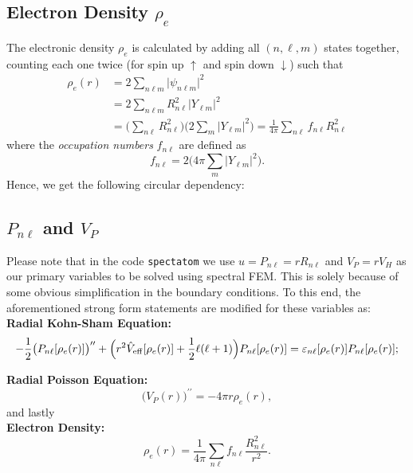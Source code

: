 \documentclass[12pt,dvipsnames]{article}
\begin{document}
\subsection{Electron Density $\rho_e$} \label{sec:nonlin}
The electronic density $\rho_e$ is calculated by adding all $(n, \ell, m)$ states together, counting each one
twice (for spin up $\uparrow$ and spin down $\downarrow$) such that
\begin{align*}
\rho_e(r) & = 2 \sum\limits_{n \ell m} \vert \psi_{n \ell m} \vert^2 \\
& = 2 \sum\limits_{n \ell m}  R_{n \ell}^2 \vert Y_{\ell m} \vert^2\\
& = \Big( \sum\limits_{n \ell} R_{n \ell}^2 \Big) \Big(2 \sum\limits_m \vert Y_{\ell m} \vert^2 \Big) =  \frac{1}{4 \pi} \sum\limits_{n \ell} f_{n \ell} R_{n \ell}^2
\end{align*}
where the \emph{occupation numbers} $f_{n \ell}$ are defined as
\begin{equation}		\nonumber
f_{n \ell} = 2 \Big( 4 \pi \sum\limits_m \vert Y_{\ell m} \vert^2 \Big).
\end{equation}
Hence, we get the following circular dependency:\\
\begin{center}
\end{center}
%
\subsection{$P_{n \ell}$ and $V_P$}
Please note that in the code \texttt{spectatom} we use $u = P_{n \ell} = r R_{n \ell}$
and $V_P = r V_H$ as our primary variables to be solved using spectral FEM. 
This is solely because of some obvious simplification in the boundary conditions. 
To this end, the aforementioned strong form statements are modified for these variables 
as:\\

\noindent
{\bf Radial Kohn-Sham Equation:}
\begin{equation}
-\frac{1}{2} \big( P_{n \ell}[\rho_e(r)] \big)^{\prime\prime} + \Big(r^2 \hat{V}_{\rm{eff}}[\rho_e(r)] + \frac{1}{2} \ell (\ell + 1) \Big) P_{n \ell}[\rho_e(r)] = \varepsilon_{n \ell}[\rho_e(r)] P_{n \ell}[\rho_e(r)];
\end{equation}

\noindent
{\bf Radial Poisson Equation:}
\begin{equation}
\big(V_P(r)\big)^{\prime\prime} = -4 \pi r \rho_e(r),
\end{equation} 
and lastly\\
{\bf Electron Density:}
\begin{equation}
\rho_e(r) = \frac{1}{4 \pi} \sum\limits_{n \ell} f_{n \ell} \frac{R_{n \ell}^2}{r^2}.
\end{equation}
%
%
\end{document}
